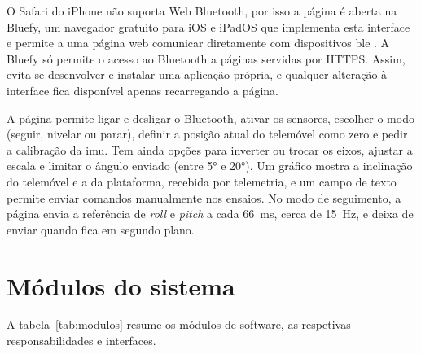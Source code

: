 O Safari do iPhone não suporta Web Bluetooth, por isso a página é aberta na Bluefy, um navegador gratuito para iOS e iPadOS que implementa esta interface e permite a uma página web comunicar diretamente com dispositivos \gls{ble} \cite{bluefy}. A Bluefy só permite o acesso ao Bluetooth a páginas servidas por HTTPS. Assim, evita-se desenvolver e instalar uma aplicação própria, e qualquer alteração à interface fica disponível apenas recarregando a página.

A página permite ligar e desligar o Bluetooth, ativar os sensores, escolher o modo (seguir, nivelar ou parar), definir a posição atual do telemóvel como zero e pedir a calibração da \gls{imu}. Tem ainda opções para inverter ou trocar os eixos, ajustar a escala e limitar o ângulo enviado (entre \ang{5} e \ang{20}). Um gráfico mostra a inclinação do telemóvel e a da plataforma, recebida por telemetria, e um campo de texto permite enviar comandos manualmente nos ensaios. No modo de seguimento, a página envia a referência de \textit{roll} e \textit{pitch} a cada \SI{66}{\milli\second}, cerca de \SI{15}{\hertz}, e deixa de enviar quando fica em segundo plano.


\section{Módulos do sistema}
A tabela~\ref{tab:modulos} resume os módulos de software, as respetivas responsabilidades e interfaces.

